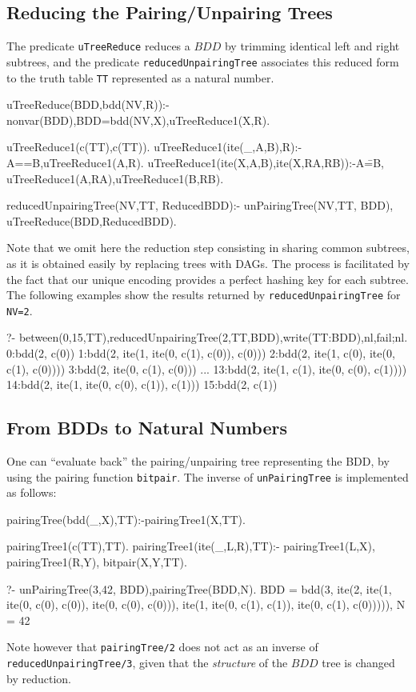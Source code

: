 \documentclass[]{INCLUDES/llncs}
\begin{document}
\subsection{Reducing the Pairing/Unpairing Trees}
The predicate {\tt uTreeReduce} reduces a $BDD$ by trimming identical 
left and right subtrees, and the predicate {\tt reducedUnpairingTree} 
associates this reduced form to the truth table {\tt TT} represented as a
natural number.
\begin{code}
uTreeReduce(BDD,bdd(NV,R)):-nonvar(BDD),BDD=bdd(NV,X),uTreeReduce1(X,R).

uTreeReduce1(c(TT),c(TT)).
uTreeReduce1(ite(_,A,B),R):-A==B,uTreeReduce1(A,R).
uTreeReduce1(ite(X,A,B),ite(X,RA,RB)):-A\==B,
  uTreeReduce1(A,RA),uTreeReduce1(B,RB).

reducedUnpairingTree(NV,TT, ReducedBDD):-
  unPairingTree(NV,TT, BDD),
  uTreeReduce(BDD,ReducedBDD).
\end{code}
Note that we omit here the reduction step consisting in
sharing common subtrees, as it is obtained easily by replacing
trees with DAGs. The process is facilitated by the fact
that our unique encoding provides a perfect hashing
key for each subtree. The following examples 
show the results returned by {\tt reducedUnpairingTree} for {\tt NV=2}.

\begin{codex}
?- between(0,15,TT),reducedUnpairingTree(2,TT,BDD),write(TT:BDD),nl,fail;nl.
0:bdd(2, c(0))
1:bdd(2, ite(1, ite(0, c(1), c(0)), c(0)))
2:bdd(2, ite(1, c(0), ite(0, c(1), c(0))))
3:bdd(2, ite(0, c(1), c(0)))
...
13:bdd(2, ite(1, c(1), ite(0, c(0), c(1))))
14:bdd(2, ite(1, ite(0, c(0), c(1)), c(1)))
15:bdd(2, c(1))
\end{codex}

\subsection{From BDDs to Natural Numbers}
One can ``evaluate back'' the pairing/unpairing tree representing the BDD,
by using the pairing function {\tt bitpair}.  
The inverse of {\tt unPairingTree} is implemented as follows:
\begin{code}
pairingTree(bdd(_,X),TT):-pairingTree1(X,TT).

pairingTree1(c(TT),TT).
pairingTree1(ite(_,L,R),TT):-
  pairingTree1(L,X),
  pairingTree1(R,Y),
  bitpair(X,Y,TT).
\end{code}

\begin{codex}
?- unPairingTree(3,42, BDD),pairingTree(BDD,N).
BDD = bdd(3, 
          ite(2, 
              ite(1, 
                  ite(0, c(0), c(0)), 
                  ite(0, c(0), c(0))), 
              ite(1, 
                  ite(0, c(1), c(1)), 
                  ite(0, c(1), c(0))))),
N = 42
\end{codex}
\noindent Note however that {\tt pairingTree/2} does not act as an
inverse of {\tt reducedUnpairingTree/3}, given that the {\em structure} of the $BDD$ tree 
is changed by reduction.
\end{document}
